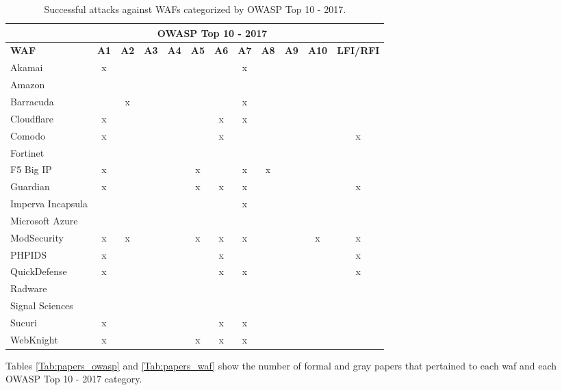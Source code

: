 \begin{table}[!htbp]
\begin{tabular}{|l|c|c|c|c|c|c|c|c|c|c|c|}
\hline
& \multicolumn{10}{c|}{\textbf{OWASP Top 10 - 2017}} &
\\ \hline
\textbf{WAF}      & \multicolumn{1}{l|}{\textbf{A1}} & \multicolumn{1}{l|}{\textbf{A2}} & \multicolumn{1}{l|}{\textbf{A3}} & \multicolumn{1}{l|}{\textbf{A4}} & \multicolumn{1}{l|}{\textbf{A5}} & \multicolumn{1}{l|}{\textbf{A6}} & \multicolumn{1}{l|}{\textbf{A7}} & \multicolumn{1}{l|}{\textbf{A8}} & \multicolumn{1}{l|}{\textbf{A9}} & \multicolumn{1}{l|}{\textbf{A10}} & \multicolumn{1}{l|}{\textbf{LFI/RFI}} \\ \hline
Akamai & x &  &  & & & & x & & & &
\\ \hline
Amazon & & & & & & & & & & &
\\ \hline
Barracuda & & x & & & & & x & & & &
\\ \hline
Cloudflare & x & & & & & x & x & & & &
\\ \hline
Comodo & x & & & & & x & & & & & x
\\ \hline
Fortinet & & & & & & & & & & &
\\ \hline
F5 Big IP & x & & & & x & & x & x & & &
\\ \hline
Guardian & x & & & & x & x & x & & & & x
\\ \hline
Imperva Incapsula & & & & & & & x & & & &
\\ \hline
Microsoft Azure & & & & & & & & & & &
\\ \hline
ModSecurity & x & x & & & x & x & x & & & x & x
\\ \hline
PHPIDS & x & & & & & x & & & & & x
\\ \hline
QuickDefense & x & & & & & x & x & & & & x
\\ \hline
Radware & & & & & & & & & & &
\\ \hline
Signal Sciences & & & & & & & & & & &
\\ \hline
Sucuri & x & & & & & x & x & & & &
\\ \hline
WebKnight & x & & & & x & x & x & & & &
\\ \hline

\end{tabular}
  \caption{Successful attacks against WAFs categorized by OWASP Top 10 - 2017.}
  \label{Tab:successful_attacks}
\end{table}
Tables \ref{Tab:papers_owasp} and \ref{Tab:papers_waf} show the number of formal and gray papers that pertained to each \acrshort{waf} and each OWASP Top 10 - 2017 category.

